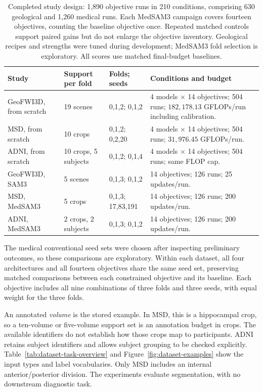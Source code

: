 \documentclass[12pt,a4paper]{article}
\begin{document}
\begin{table}[htbp]
\centering\small{}
\begin{tabular}{@{}P{2.5cm}P{3.0cm}P{3.2cm}P{5.7cm}@{}}
\hline
Study & Support per fold & Folds; seeds & Conditions and budget \\
\hline
GeoFWI3D, from scratch & 19 scenes & 0,1,2; 0,1,2 & 4 models $\times$ 14 objectives; 504 runs; $182{,}178.13$ GFLOPs/run including calibration. \\[.5em]
MSD, from scratch & 10 crops & 0,1,2; 0,2,20 & 4 models $\times$ 14 objectives; 504 runs; $31{,}976.45$ GFLOPs/run. \\[.5em]
ADNI, from scratch & 10 crops, 5 subjects & 0,1,2; 0,1,4 & 4 models $\times$ 14 objectives; 504 runs; same FLOP cap. \\[.5em]
GeoFWI3D, SAM3 & 5 scenes & 0,1,3; 0,1,2 & 14 objectives; 126 runs; 25 updates/run. \\[.5em]
MSD, MedSAM3 & 5 crops & 0,1,3; 17,83,191 & 14 objectives; 126 runs; 200 updates/run. \\[.5em]
ADNI, MedSAM3 & 2 crops, 2 subjects & 0,1,3; 0,1,2 & 14 objectives; 126 runs; 200 updates/run. \\
\hline
\end{tabular}
\caption{Completed study design: 1,890 objective runs in 210 conditions,
comprising 630 geological and 1,260 medical runs.
Each MedSAM3 campaign covers fourteen objectives, counting the baseline
objective once. Repeated matched controls support paired gains but do
not enlarge the objective inventory.
Geological recipes and strengths were tuned during development;
MedSAM3 fold selection is exploratory.
All scores use matched final-budget baselines.}
\label{tab:experimental-design}
\end{table}

The medical conventional seed sets were chosen after inspecting
preliminary outcomes, so these comparisons are exploratory.
Within each dataset, all four
architectures and all fourteen objectives share the same seed set,
preserving matched comparisons between each constrained objective and
its baseline. Each objective includes all nine combinations of three
folds and three seeds, with equal weight for the three folds.

An annotated \emph{volume} is the stored example. In MSD, this is a
hippocampal crop, so a ten-volume or five-volume support set is an
annotation budget in crops. The available identifiers do not establish
how those crops map to participants. ADNI retains subject identifiers
and allows subject grouping to be checked explicitly.
Table~\ref{tab:dataset-task-overview} and
Figure~\ref{fig:dataset-examples} show the input types and label
vocabularies. Only MSD includes an internal anterior/posterior division.
The experiments evaluate segmentation, with no downstream diagnostic task.
\end{document}
